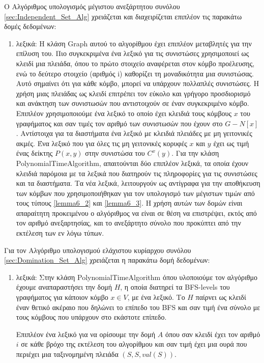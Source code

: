 Ο Αλγόριθμος υπολογισμός μέγιστου ανεξάρτητου συνόλου \ref{sec:Independent_Set_Alg} χρειάζεται και διαχειρίζεται επιπλέον τις παρακάτω δομές δεδομένων:
\begin{enumerate}
	\item λεξικά: Η κλάση Graph αυτού το αλγορίθμου έχει επιπλέον μεταβλητές για την επίλυση του. Πιο συγκεκριμένα ένα λεξικό για τις συνιστώσες χρησιμοποιεί ως κλειδί μια πλειάδα, όπου το πρώτο στοιχείο αναφέρεται στον κόμβο προέλευσης, ενώ το δεύτερο στοιχείο (αριθμός i) καθορίζει τη μοναδικότητα μια συνιστώσας. Αυτό σημαίνει ότι για κάθε κόμβο, μπορεί να υπάρχουν πολλαπλές συνιστώσες. Η χρήση μιας πλειάδας ως κλειδί επιτρέπει τον εύκολο και γρήγορο προσδιορισμό και ανάκτηση των συνιστωσών που αντιστοιχούν σε έναν συγκεκριμένο κόμβο. Επιπλέον χρησιμοποιούμε ένα λεξικό το οποίο έχει κλειδιά τους κόμβους $x$ του γραφήματος και σαν τιμές τον αριθμό των συνιστωσών που έχουν στο $G - N[x]$. Αντίστοιχα για τα διαστήματα ένα λεξικό με κλειδιά πλειάδες με μη γειτονικές ακμές. Ένα λεξικό που για όλες τις μη γειτονικές κορυφές $x$ και $y$ έχει ως τιμή ένας δείκτης $P(x, y)$ στην συνιστώσα του $C^x(y)$. Για την κλάση PolynomialTimeAlgorithm, απαιτούνται δύο επιπλέον λεξικά, τα οποία έχουν κλειδιά παρόμοια με τα λεξικά που διατηρούν τις πληροφορίες για τις συνιστώσες και τα διαστήματα. Τα νέα λεξικά, λειτουργούν ως αντίγραφα για την αποθήκευση των κόμβων που χρησιμοποιήθηκαν για τον υπολογισμό των μέγιστων τιμών από τους τύπους \ref{lemma6_2} και \ref{lemma6_3}. Η χρήση αυτών των δομών είναι απαραίτητη προκειμένου ο αλγόριθμος να είναι σε θέση να επιστρέψει, εκτός από τον αριθμό ανεξαρτησίας, και το ανεξάρτητο σύνολο που προκύπτει από την εκτέλεση των εν λόγω τύπων.
\end{enumerate}

Για τον Αλγόριθμο υπολογισμού ελάχιστου κυρίαρχου συνόλου \ref{sec:Domination_Set_Alg} χρειάζεται η παρακάτω δομή δεδομένων:
\begin{enumerate}
	\item λεξικά: Στην κλάση PolynomialTimeAlgorithm όπου υλοποιούμε τον αλγόριθμο έχουμε αναπαραστήσει την δομή $H$, η οποία 
	διατηρεί τα BFS-levels του γραφήματος για κάποιον κόμβο $x \in V$, με ένα λεξικό. Το $Η$ παίρνει ως κλειδί έναν θετικό ακέραιο που δηλώνει το επίπεδο του BFS και σαν τιμή ένα σύνολο  με τους κόμβους που υπάρχουν στο εκάστοτε επίπεδο. 
	
	Επιπλέον ένα λεξικό για να ορίσουμε την δομή $A$ όπου σαν κλειδί έχει τον αριθμό $i$ σε κάθε βρόχο της εκτέλεση του αλγορίθμου και σαν τιμή έχει μια ουρά που περιέχει μια ταξινομημένη πλειάδα $(S, S, val(S))$.
\end{enumerate}

